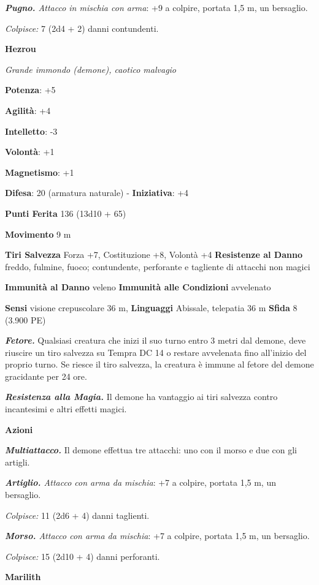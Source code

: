 \begin{multicols}{2}
\emph{\textbf{Pugno.} Attacco in mischia con arma}: +9 a colpire,
portata 1,5 m, un bersaglio.

\emph{Colpisce:} 7 (2d4 + 2) danni contundenti.

\textbf{Hezrou}

\emph{Grande immondo (demone), caotico malvagio}

\textbf{Potenza}: +5

\textbf{Agilità}: +4

\textbf{Intelletto}: -3

\textbf{Volontà}: +1

\textbf{Magnetismo}: +1

\textbf{Difesa}: 20 (armatura naturale) - \textbf{Iniziativa}: +4

\textbf{Punti Ferita} 136 (13d10 + 65)

\textbf{Movimento} 9 m

\textbf{Tiri Salvezza} Forza +7, Costituzione +8, Volontà +4
\textbf{Resistenze al Danno} freddo, fulmine, fuoco; contundente,
perforante e tagliente di attacchi non magici

\textbf{Immunità al Danno} veleno \textbf{Immunità alle Condizioni}
avvelenato

\textbf{Sensi} visione crepuscolare 36 m, 
\textbf{Linguaggi} Abissale, telepatia 36 m \textbf{Sfida} 8 (3.900 PE)

\emph{\textbf{Fetore.}} Qualsiasi creatura che inizi il suo turno entro
3 metri dal demone, deve riuscire un tiro salvezza su Tempra DC 14
o restare avvelenata fino all'inizio del proprio turno. Se riesce il
tiro salvezza, la creatura è immune al fetore del demone gracidante per
24 ore.

\emph{\textbf{Resistenza alla Magia.}} Il demone ha vantaggio ai tiri
salvezza contro incantesimi e altri effetti magici.

\textbf{Azioni}

\emph{\textbf{Multiattacco.}} Il demone effettua tre attacchi: uno con
il morso e due con gli artigli.

\emph{\textbf{Artiglio.} Attacco con arma da mischia}: +7 a colpire,
portata 1,5 m, un bersaglio.

\emph{Colpisce:} 11 (2d6 + 4) danni taglienti.

\emph{\textbf{Morso.} Attacco con arma da mischia}: +7 a colpire,
portata 1,5 m, un bersaglio.

\emph{Colpisce:} 15 (2d10 + 4) danni perforanti.

\textbf{Marilith}


\end{multicols}

